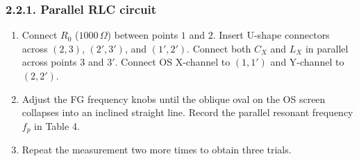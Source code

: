 \documentclass[12pt,oneside,a4paper]{article}
\theoremstyle{definition}
\begin{document}
	\subsubsection*{2.2.1. Parallel RLC circuit}
	\begin{enumerate}[leftmargin=1.5em]
		\item Connect $R_0$ ($1000\,\Omega$) between points $1$ and $2$. Insert U-shape connectors across $(2,3)$, $(2',3')$, and $(1',2')$. Connect both $C_X$ and $L_X$ in parallel across points $3$ and $3'$. Connect OS X-channel to $(1,1')$ and Y-channel to $(2,2')$.
		\item Adjust the FG frequency knobs until the oblique oval on the OS screen collapses into an inclined straight line. Record the parallel resonant frequency $f_p$ in Table 4.
		\item Repeat the measurement two more times to obtain three trials.
	\end{enumerate}
\end{document}
